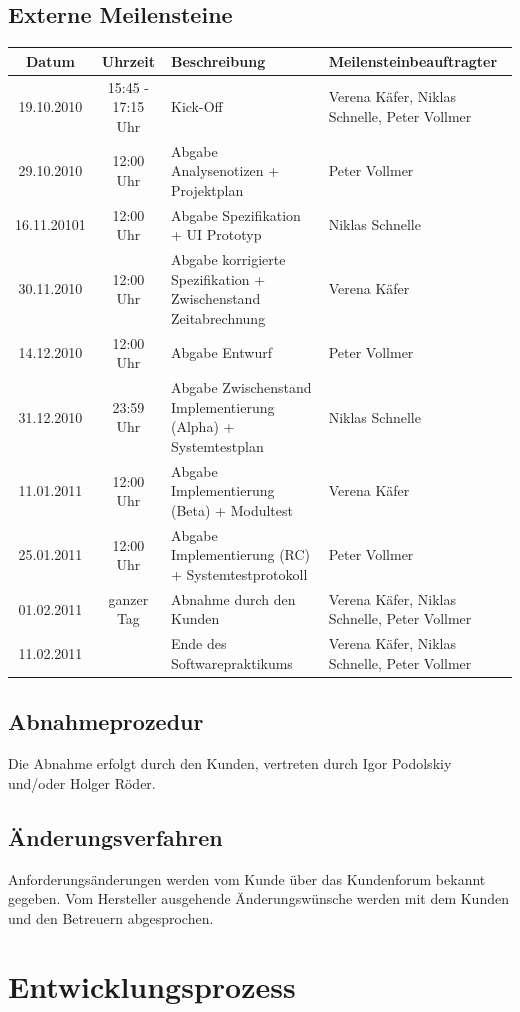 \documentclass[a4paper,10pt]{scrartcl}
\begin{document}
\subsection{Externe Meilensteine}
\begin{tabular}{|c|c|p{14em}|p{14em}|}
\hline Datum & Uhrzeit & Beschreibung & Meilensteinbeauftragter\\ 
\hline 19.10.2010 & 15:45 - 17:15 Uhr & Kick-Off & Verena Käfer, Niklas Schnelle, Peter Vollmer\\ 
\hline 29.10.2010 & 12:00 Uhr & Abgabe Analysenotizen + Projektplan & Peter Vollmer\\ 
\hline 16.11.20101 & 12:00 Uhr & Abgabe Spezifikation + UI Prototyp & Niklas Schnelle\\ 
\hline 30.11.2010 & 12:00 Uhr & Abgabe korrigierte Spezifikation + Zwischenstand Zeitabrechnung & Verena Käfer\\ 
\hline 14.12.2010 & 12:00 Uhr & Abgabe Entwurf & Peter Vollmer\\ 
\hline 31.12.2010 & 23:59 Uhr & Abgabe Zwischenstand Implementierung (Alpha) + Systemtestplan & Niklas Schnelle\\ 
\hline 11.01.2011 & 12:00 Uhr & Abgabe Implementierung (Beta) + Modultest & Verena Käfer\\ 
\hline 25.01.2011 & 12:00 Uhr & Abgabe Implementierung (RC) + Systemtestprotokoll & Peter Vollmer\\ 
\hline 01.02.2011 & ganzer Tag & Abnahme durch den Kunden & Verena Käfer, Niklas Schnelle, Peter Vollmer\\ 
\hline 11.02.2011 & & Ende des Softwarepraktikums & Verena Käfer, Niklas Schnelle, Peter Vollmer\\ 
\hline 
\end{tabular} 
\subsection{Abnahmeprozedur}
Die Abnahme erfolgt durch den Kunden, vertreten durch Igor Podolskiy und/oder Holger Röder.
\subsection{Änderungsverfahren}
Anforderungsänderungen werden vom Kunde über das Kundenforum bekannt gegeben. Vom Hersteller ausgehende Änderungswünsche werden mit dem
Kunden und den Betreuern abgesprochen.


\section{Entwicklungsprozess}
\end{document}
